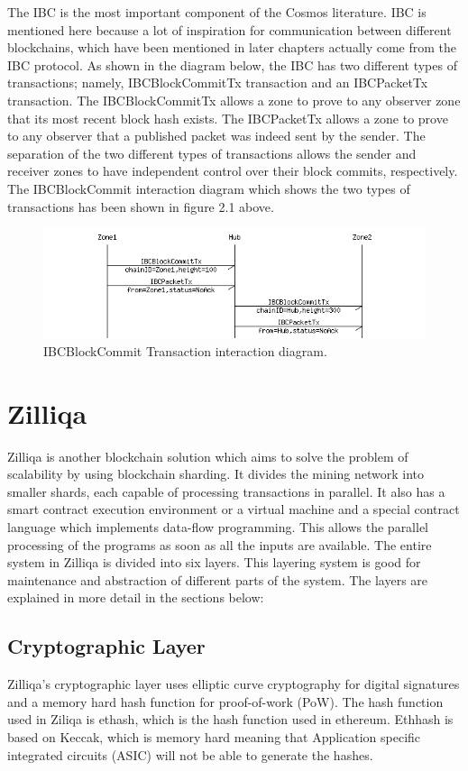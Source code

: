 \documentclass[a4paper,twoside,phd]{BYUPhys}
\begin{document}
The IBC is the most important component of the Cosmos literature. IBC is mentioned here because a lot of inspiration for communication between different blockchains, which have been mentioned in later chapters actually come from the IBC protocol. As shown in the diagram below, the IBC has two different types of transactions; namely, IBCBlockCommitTx transaction and an IBCPacketTx transaction. The IBCBlockCommitTx allows a zone to prove to any observer zone that its most recent block hash exists. The IBCPacketTx allows a zone to prove to any observer that a published packet was indeed sent by the sender. The separation of the two different types of transactions allows the sender and receiver zones to have independent control over their block commits, respectively. The IBCBlockCommit interaction diagram which shows the two types of transactions has been shown in figure 2.1 above.
\begin{figure}
  \includegraphics[width=\linewidth]{ibc_transactions.png}
  \caption{IBCBlockCommit Transaction interaction diagram.}
  \label{fig:1}
\end{figure}

\section{Zilliqa}
Zilliqa is another blockchain solution which aims to solve the problem of scalability by using blockchain sharding. It divides the mining network into smaller shards, each capable of processing transactions in parallel. It also has a smart contract execution environment or a virtual machine and a special contract language which implements data-flow programming. This allows the parallel processing of the programs as soon as all the inputs are available. The entire system in Zilliqa is divided into six layers. This layering system is good for maintenance and abstraction of different parts of the system. The layers are explained in more detail in the sections below:

\subsection{Cryptographic Layer}
Zilliqa's cryptographic layer uses elliptic curve cryptography for digital signatures and a memory hard hash function for proof-of-work (PoW). The hash function used in Ziliqa is ethash, which is the hash function used in ethereum. Ethhash is based on Keccak, which is memory hard meaning that Application specific integrated circuits (ASIC) will not be able to generate the hashes. 
\end{document}
